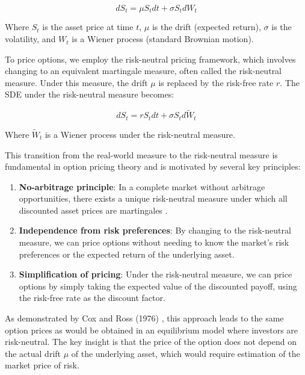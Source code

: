 \documentclass[12pt]{article}
\begin{document}
\begin{equation}
    dS_t = \mu S_t dt + \sigma S_t dW_t
\end{equation}

Where $S_t$ is the asset price at time $t$, $\mu$ is the drift (expected return), $\sigma$ is the volatility, and $W_t$ is a Wiener process (standard Brownian motion).

To price options, we employ the risk-neutral pricing framework, which involves changing to an equivalent martingale measure, often called the risk-neutral measure. Under this measure, the drift $\mu$ is replaced by the risk-free rate $r$. The SDE under the risk-neutral measure becomes:

\begin{equation}
    dS_t = r S_t dt + \sigma S_t d\tilde{W}_t
\end{equation}

Where $\tilde{W}_t$ is a Wiener process under the risk-neutral measure.

This transition from the real-world measure to the risk-neutral measure is fundamental in option pricing theory and is motivated by several key principles:

\begin{enumerate}
    \item \textbf{No-arbitrage principle}: In a complete market without arbitrage opportunities, there exists a unique risk-neutral measure under which all discounted asset prices are martingales \cite{Harrison1979}.
    
    \item \textbf{Independence from risk preferences}: By changing to the risk-neutral measure, we can price options without needing to know the market's risk preferences or the expected return of the underlying asset.
    
    \item \textbf{Simplification of pricing}: Under the risk-neutral measure, we can price options by simply taking the expected value of the discounted payoff, using the risk-free rate as the discount factor.
\end{enumerate}

As demonstrated by Cox and Ross (1976) \cite{Cox1976}, this approach leads to the same option prices as would be obtained in an equilibrium model where investors are risk-neutral. The key insight is that the price of the option does not depend on the actual drift $\mu$ of the underlying asset, which would require estimation of the market price of risk.
\end{document}
